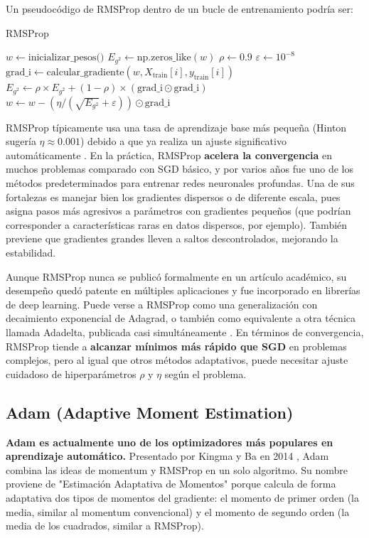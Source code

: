 \documentclass[12pt, spanish]{article}
\begin{document}
Un pseudocódigo de RMSProp dentro de un bucle de entrenamiento podría ser:

\begin{algorithm}[H]
\caption{RMSProp}
\begin{algorithmic}[1]
\State $w \gets \text{inicializar\_pesos()}$
\State $E_{g^2} \gets \text{np.zeros\_like}(w)$ 
\State $\rho \gets 0.9$
\State $\varepsilon \gets 10^{-8}$
        \State $\text{grad\_i} \gets \text{calcular\_gradiente}(w, X_{\text{train}}[i], y_{\text{train}}[i])$
        \State $E_{g^2} \gets \rho \times E_{g^2} + (1 - \rho) \times (\text{grad\_i} \odot \text{grad\_i})$ 
        \State $w \gets w - \left( \eta / (\sqrt{E_{g^2}} + \varepsilon) \right) \odot \text{grad\_i}$
    \EndFor
\EndFor
\end{algorithmic}
\end{algorithm}

RMSProp típicamente usa una tasa de aprendizaje base más pequeña (Hinton sugería $\eta \approx 0.001$) debido a que ya realiza un ajuste significativo automáticamente \cite{ref3}. En la práctica, RMSProp \textbf{acelera la convergencia} en muchos problemas comparado con SGD básico, y por varios años fue uno de los métodos predeterminados para entrenar redes neuronales profundas. Una de sus fortalezas es manejar bien los gradientes dispersos o de diferente escala, pues asigna pasos más agresivos a parámetros con gradientes pequeños (que podrían corresponder a características raras en datos dispersos, por ejemplo). También previene que gradientes grandes lleven a saltos descontrolados, mejorando la estabilidad.

Aunque RMSProp nunca se publicó formalmente en un artículo académico, su desempeño quedó patente en múltiples aplicaciones y fue incorporado en librerías de deep learning. Puede verse a RMSProp como una generalización con decaimiento exponencial de Adagrad, o también como equivalente a otra técnica llamada Adadelta, publicada casi simultáneamente \cite{ref3}. En términos de convergencia, RMSProp tiende a \textbf{alcanzar mínimos más rápido que SGD} en problemas complejos, pero al igual que otros métodos adaptativos, puede necesitar ajuste cuidadoso de hiperparámetros $\rho$ y $\eta$ según el problema.

\subsection{Adam (Adaptive Moment Estimation)}
\textbf{Adam es actualmente uno de los optimizadores más populares en aprendizaje automático.} Presentado por Kingma y Ba en 2014 \cite{ref2}, Adam combina las ideas de momentum y RMSProp en un solo algoritmo. Su nombre proviene de "Estimación Adaptativa de Momentos" porque calcula de forma adaptativa dos tipos de momentos del gradiente: el momento de primer orden (la media, similar al momentum convencional) y el momento de segundo orden (la media de los cuadrados, similar a RMSProp).
\end{document}
